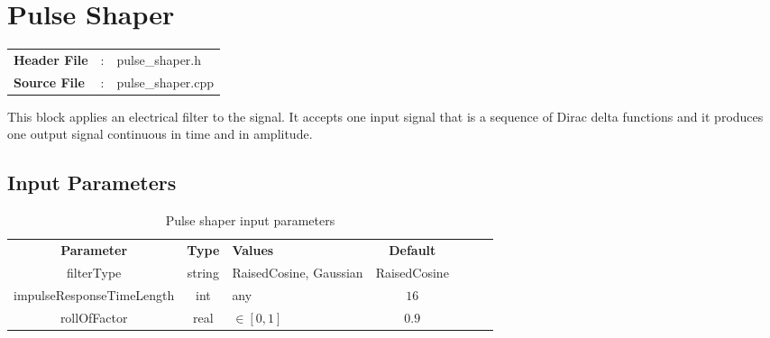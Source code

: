 \clearpage

\section{Pulse Shaper}

\begin{tcolorbox}	
	\begin{tabular}{p{2.75cm} p{0.2cm} p{10.5cm}} 	
		\textbf{Header File}   &:& pulse\_shaper.h \\
		\textbf{Source File}   &:& pulse\_shaper.cpp \\
	\end{tabular}
\end{tcolorbox}

This block applies an electrical filter to the signal. It accepts one input signal that is a sequence of Dirac delta functions and it produces one output signal continuous in time and in amplitude.

\subsection*{Input Parameters}

\begin{table}[h]
	\centering
	\begin{tabular}{|c|c|p{60mm}|c|ccp{60mm}}
		\cline{1-4}
		\textbf{Parameter} & \textbf{Type} & \textbf{Values} &   \textbf{Default}& \\ \cline{1-4}
		filterType & string & RaisedCosine, Gaussian & RaisedCosine \\ \cline{1-4}
		impulseResponseTimeLength & int & any & $16$ \\ \cline{1-4}
		rollOfFactor & real & $\in \left[0,1\right]$ & $0.9$ \\ \cline{1-4} 
	\end{tabular}
	\caption{Pulse shaper input parameters}
	\label{table:pulse_shaper_in_par}
\end{table}


